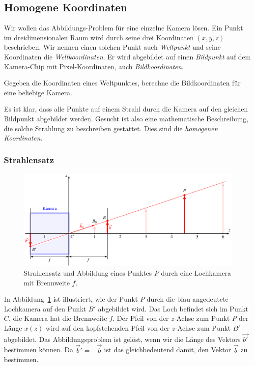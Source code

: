 %
%
%
\subsection{Homogene Koordinaten\label{section:homogene koordinaten}}
Wir wollen das Abbildungs-Problem für eine einzelne Kamera lösen.
Ein Punkt im dreidimensionalen Raum wird durch seine drei Koordinaten
$(x,y,z)$ beschrieben.
Wir nennen einen solchen Punkt auch {\em Weltpunkt} und seine Koordinaten
die {\em Weltkoordinaten}.
%
%
Er wird abgebildet auf einen {\em Bildpunkt} auf dem Kamera-Chip mit
Pixel-Koordinaten, auch {\em Bildkoordinaten}.
%
%
\begin{aufgabe}
Gegeben die Koordinaten eines Weltpunktes, berechne die Bildkoordinaten
für eine beliebige Kamera.
\end{aufgabe}
Es ist klar, dass alle Punkte auf einem Strahl durch die Kamera auf den
gleichen Bildpunkt abgebildet werden.
Gesucht ist also eine mathematische Beschreibung, die solche Strahlung
zu beschreiben gestattet.
Dies sind die {\em homogenen Koordinaten}.

\subsubsection{Strahlensatz}
\begin{figure}
\centering
\includegraphics{applications/kamera/strahlensatz.pdf}
\caption{Strahlensatz und Abbildung eines Punktes $P$ durch eine Lochkamera
mit Brennweite $f$.
\label{skript:kamera:strahlensatz}}
\end{figure}
In Abbildung~\ref{skript:kamera:strahlensatz} ist illustriert, wie
der Punkt $P$ durch die blau angedeutete Lochkamera auf den Punkt $B'$
abgebildet wird.
Das Loch befindet sich im Punkt $C$, die Kamera hat die Brennweite $f$.
Der Pfeil von der $z$-Achse zum Punkt $P$ der Länge $x(z)$ wird
auf den kopfstehenden Pfeil von der $z$-Achse zum Punkt $B'$ abgebildet.
Das Abbildungsproblem ist gelöst, wenn wir die Länge des Vektors $\vec{b'}$
bestimmen können.
Da $\vec{b}'=-\vec{b}$ ist das gleichbedeutend damit, den Vektor $\vec{b}$
zu bestimmen.

